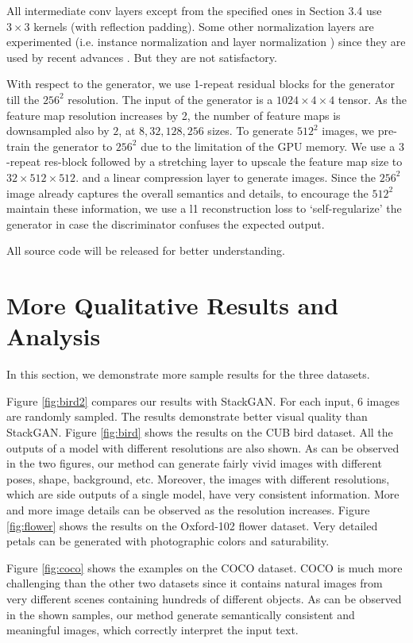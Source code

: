 \documentclass[10pt, letterpaper]{article}
\begin{document}
All intermediate conv layers except from the specified ones in Section 3.4 use $3{\times}3$ kernels (with reflection padding).
Some other normalization layers are experimented (i.e. instance normalization \cite{ulyanov2016instance} and layer normalization \cite{ba2016layer}) since they are used by recent advances \cite{zhu2017unpaired,chen2017photographic}. But they are not satisfactory. 

With respect to the generator, we use 1-repeat residual blocks for the generator till the $256^2$ resolution. The input of the generator is a $1024{\times}4{\times}4$ tensor. As the feature map resolution increases by 2, the number of feature maps is downsampled also by $2$, at $8, 32, 128, 256$ sizes. 
To generate $512^2$ images, we pre-train the generator to $256^2$ due to the limitation of the GPU memory. We use a $3$-repeat res-block followed by a stretching layer to upscale the feature map size to $32{\times}512{\times}512$. and a linear compression layer to generate images. 
Since the $256^2$ image already captures the overall semantics and details, to encourage the $512^2$ maintain these information, we use a l1 reconstruction loss to `self-regularize' the generator in case the discriminator confuses the expected output.

All source code will be released for better understanding.

\section{More Qualitative Results and Analysis}
In this section, we demonstrate more sample results for the three datasets.

Figure \ref{fig:bird2} compares our results with StackGAN. For each input, 6 images are randomly sampled. The results demonstrate better visual quality than StackGAN.
Figure \ref{fig:bird} shows the results on the CUB bird dataset. All the outputs of a model with different resolutions are also shown. As can be observed in the two figures, our method can generate fairly vivid images with different poses, shape, background, etc. Moreover, the images with different resolutions, which are side outputs of a single model, have very consistent information. More and more image details can be observed as the resolution increases.
Figure \ref{fig:flower} shows the results on the Oxford-102 flower dataset. Very detailed petals can be generated with photographic colors and saturability.

Figure \ref{fig:coco} shows the examples on the COCO dataset. COCO is much more challenging than the other two datasets since it contains natural images from very different scenes containing hundreds of different objects. 
As can be observed in the shown samples, our method generate semantically consistent and meaningful images, which correctly interpret the input text. 
\end{document}
